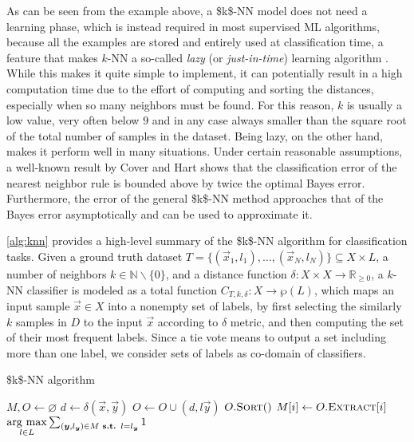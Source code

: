 As can be seen from the example above, a \acs{$k$-NN} model does not need a learning phase, which is instead required in most supervised \acs{ML} algorithms, because all the examples are stored and entirely used at classification time, a feature that makes $k$-NN a so-called \emph{lazy} (or \emph{just-in-time}) learning algorithm \cite{bontempi}. While this makes it quite simple to implement, it can potentially result in a high computation time due to the effort of computing and sorting the distances, especially when so many neighbors must be found. For this reason, $k$ is usually a low value, very often below $9$ and in any case always smaller than the square root of the total number of samples in the dataset. Being lazy, on the other hand, makes it perform well in many situations. Under certain reasonable assumptions, a well-known result by Cover and Hart \cite{cover1967} shows that the classification error of the nearest neighbor rule is bounded above by twice the optimal Bayes error. Furthermore, the error of the general \acs{$k$-NN} method approaches that of the Bayes error asymptotically and can be used to approximate it.
\vspace{6pt}

\autoref{alg:knn} provides a high-level summary of the \acs{$k$-NN} algorithm for classification tasks. Given a ground truth dataset $T = \{(\vec{x}_1, l_1),\dots, (\vec{x}_{N}, l_N)\} \subseteq X \times L$, a number of neighbors $k\in \mathbb{N} \smallsetminus \{0\}$, and a distance function $\delta\colon X \times X \rightarrow \mathbb{R}_{\geq 0}$, a $k$-NN classifier is modeled as a total function $C_{T, k, \delta}\colon X \rightarrow \wp(L)$, which maps an input sample $\vec{x} \in X$ into a nonempty set of labels, by first selecting the similarly $k$ samples in $D$ to the input $\vec{x}$ according to $\delta$ metric, and then computing the set of their most frequent labels.  Since a tie vote means to output a set including more than one label, we consider sets of labels as co-domain of classifiers.

\begin{algorithm}[H]
	\caption[$k$-NN algorithm]{\acs{$k$-NN} algorithm}
	\label{alg:knn}
	\begin{algorithmic}[1]

    \State $M, O \gets \varnothing$
			\State $d \gets \delta(\vec{x}, \vec{y})$
			\State $O \gets O \cup (d, l{\vec{y}})$
		\EndFor
		\State $O.\textsc{Sort}()$
			\State $M[i] \gets O.\textsc{Extract}[i]$
		\EndFor
		\State \Return $\operatorname*{\arg\,\max}\limits_{l \in L} \sum_{(\bm{y}, l_{\bm{y}}) \in M \textbf{ s.t. } l = l_{\bm{y}}} 1$
	\end{algorithmic}
\end{algorithm}


